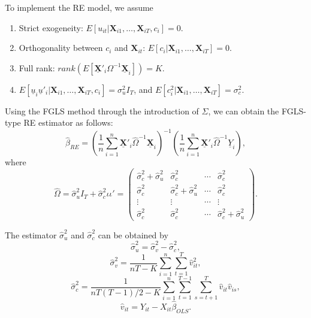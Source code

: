 \documentclass[
  12pt,
]{article}
\providecommand{\tightlist}{%
  \setlength{\itemsep}{0pt}\setlength{\parskip}{0pt}}
\begin{document}
To implement the RE model, we assume

\begin{enumerate}
\def\labelenumi{\arabic{enumi}.}
\tightlist
\item
  Strict exogeneity:
  \(E[u_{it} | \mathbf{X}_{i1}, \ldots, \mathbf{X}_{iT}, c_i] = 0\).
\item
  Orthogonality between \(c_i\) and \(\mathbf{X}_{it}\):
  \(E[c_i | \mathbf{X}_{i1}, \ldots, \mathbf{X}_{iT}] = 0\).
\item
  Full rank:
  \(rank(E[\underline{\mathbf{X}}'_i \Omega^{-1} \underline{\mathbf{X}}_i]) = K\).
\item
  \(E[\underline{u}_i\underline{u}'_i | \mathbf{X}_{i1}, \ldots, \mathbf{X}_{iT}, c_i] = \sigma_u^2 I_T\),
  and
  \(E[c_i^2 | \mathbf{X}_{i1}, \ldots, \mathbf{X}_{iT}] = \sigma_c^2\).
\end{enumerate}

Using the FGLS method through the introduction of \(\Sigma\), we can
obtain the FGLS-type RE estimator as follows: \[
  \hat{\beta}_{RE} = 
  \left( \frac{1}{n} \sum_{i=1}^n \underline{\mathbf{X}}'_i \hat{\Omega}^{-1} \underline{\mathbf{X}}_i \right)^{-1}
  \left( \frac{1}{n} \sum_{i=1}^n \underline{\mathbf{X}}'_i \hat{\Omega}^{-1} \underline{Y}_i \right),
\] where \[
  \hat{\Omega} = \hat{\sigma}_u^2 I_T + \hat{\sigma}_c^2 \iota \iota' =
  \begin{pmatrix}
    \hat{\sigma}_c^2 + \hat{\sigma}_u^2 & \hat{\sigma}_c^2 & \cdots & \hat{\sigma}_c^2 \\
    \hat{\sigma}_c^2 & \hat{\sigma}_c^2 + \hat{\sigma}_u^2 & \cdots & \hat{\sigma}_c^2 \\
    \vdots & \vdots & \cdots & \vdots \\
    \hat{\sigma}_c^2 & \hat{\sigma}_c^2 & \cdots & \hat{\sigma}_c^2 + \hat{\sigma}_u^2
  \end{pmatrix}.
\]

The estimator \(\hat{\sigma}_u^2\) and \(\hat{\sigma}_c^2\) can be
obtained by \[
  \hat{\sigma}_u^2 = \hat{\sigma}_v^2 - \hat{\sigma}_c^2,
\] \[
  \hat{\sigma}_v^2 = \frac{1}{nT - K} \sum_{i=1}^n \sum_{t=1}^T \hat{v}_{it}^2,
\] \[
  \hat{\sigma}_c^2 = 
  \frac{1}{nT(T-1)/2 - K} \sum_{i=1}^n \sum_{t=1}^{T-1} \sum_{s=t+1}^T \hat{v}_{it} \hat{v}_{is},
\] \[
  \hat{v}_{it} = Y_{it} - X_{it} \hat{\beta}_{OLS}.
\]
\end{document}
